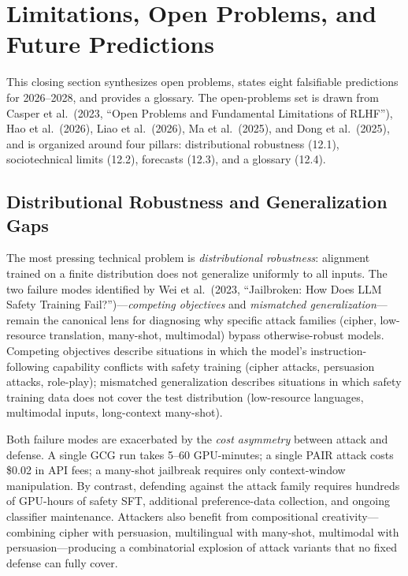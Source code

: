 \documentclass{article}
\begin{document}
\section{Limitations, Open Problems, and Future Predictions}\label{limitations-open-problems-and-future-predictions}

This closing section synthesizes open problems, states eight falsifiable predictions for 2026--2028, and provides a glossary. The open-problems set is drawn from Casper et al.~(2023, ``Open Problems and Fundamental Limitations of RLHF''), Hao et al.~(2026), Liao et al.~(2026), Ma et al.~(2025), and Dong et al.~(2025), and is organized around four pillars: distributional robustness (12.1), sociotechnical limits (12.2), forecasts (12.3), and a glossary (12.4).

\subsection{Distributional Robustness and Generalization Gaps}\label{distributional-robustness-and-generalization-gaps}

The most pressing technical problem is \emph{distributional robustness}: alignment trained on a finite distribution does not generalize uniformly to all inputs. The two failure modes identified by Wei et al.~(2023, ``Jailbroken: How Does LLM Safety Training Fail?'')---\emph{competing objectives} and \emph{mismatched generalization}---remain the canonical lens for diagnosing why specific attack families (cipher, low-resource translation, many-shot, multimodal) bypass otherwise-robust models. Competing objectives describe situations in which the model's instruction-following capability conflicts with safety training (cipher attacks, persuasion attacks, role-play); mismatched generalization describes situations in which safety training data does not cover the test distribution (low-resource languages, multimodal inputs, long-context many-shot).

Both failure modes are exacerbated by the \emph{cost asymmetry} between attack and defense. A single GCG run takes 5--60 GPU-minutes; a single PAIR attack costs \$0.02 in API fees; a many-shot jailbreak requires only context-window manipulation. By contrast, defending against the attack family requires hundreds of GPU-hours of safety SFT, additional preference-data collection, and ongoing classifier maintenance. Attackers also benefit from compositional creativity---combining cipher with persuasion, multilingual with many-shot, multimodal with persuasion---producing a combinatorial explosion of attack variants that no fixed defense can fully cover.
\end{document}
